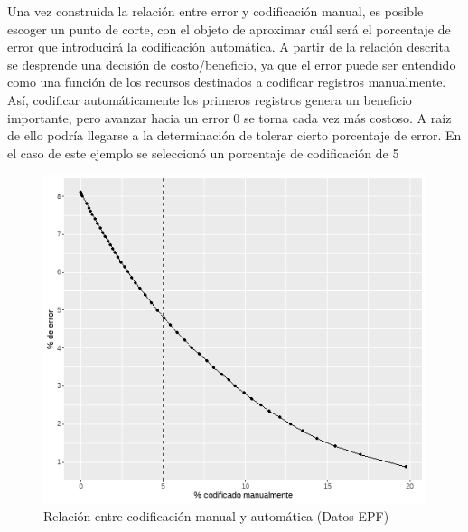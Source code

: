 \documentclass[
  12pt,
  spanish,
]{article}
\begin{document}
\begin{itemize}
\newline Una vez construida la relación entre error y codificación manual, es posible escoger un punto de corte, con el objeto de aproximar cuál será el porcentaje de error que introducirá la codificación automática. A partir de la relación descrita se desprende una decisión de costo/beneficio, ya que el error puede ser entendido como una función de los recursos destinados a codificar registros manualmente. Así, codificar automáticamente los primeros registros genera un beneficio importante, pero avanzar hacia un error 0 se torna cada vez más costoso. A raíz de ello podría llegarse a la determinación de tolerar cierto porcentaje de error. En el caso de este ejemplo se seleccionó un porcentaje de codificación de 5%


\begin{figure}[H]
\centering
\large
\caption{Relación entre codificación manual y automática (Datos EPF)}
\label{manual_vs_automatico}
\includegraphics[width=0.7\columnwidth]{imagenes/manual_vs_automatico.png}
\normalsize
\end{figure}



\end{itemize}
\end{document}
